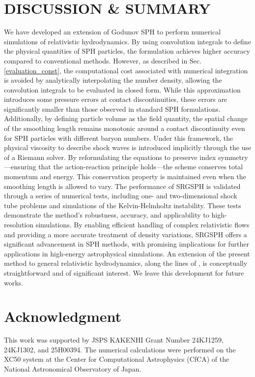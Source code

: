\documentclass[]{aastex631}
\begin{document}
\section{DISCUSSION \& SUMMARY}
We have developed an extension of Godunov SPH to perform numerical simulations of relativistic hydrodynamics.
By using convolution integrals to define the physical quantities of SPH particles, the formulation achieves higher accuracy compared to conventional methods.
However, as described in Sec. \ref{evaluation_const}, the computational cost associated with numerical integration is avoided by analytically interpolating the number density, allowing the convolution integrals to be evaluated in closed form.
While this approximation introduces some pressure errors at contact discontinuities, these errors are significantly smaller than those observed in standard SPH formulations.
Additionally, by defining particle volume as the field quantity, the spatial change of the smoothing length remains monotonic around a contact discontinuity even for SPH particles with different baryon numbers. Under this framework, the physical viscosity to describe shock waves is introduced implicitly through the use of a Riemann solver.
By reformulating the equations to preserve index symmetry—ensuring that the action-reaction principle holds—the scheme conserves total momentum and energy.
This conservation property is maintained even when the smoothing length is allowed to vary.
The performance of SRGSPH is validated through a series of numerical tests, including one- and two-dimensional shock tube problems and simulations of the Kelvin-Helmholtz instability. These tests demonstrate the method’s robustness, accuracy, and applicability to high-resolution simulations. By enabling efficient handling of complex relativistic flows and providing a more accurate treatment of density variations, SRGSPH offers a significant advancement in SPH methods, with promising implications for further applications in high-energy astrophysical simulations.
An extension of the present method to general relativistic hydrodynamics, along the lines of \citep[e.g.,][]{Rosswog_2010GR,Liptai&Price_2019}, is conceptually straightforward and of significant interest. We leave this development for future works.


\section*{Acknowledgment}
This work was supported by JSPS KAKENHI Grant Number 24KJ1259, 24KJ1302, and 25H00394.
 The numerical calculations were performed on the XC50 system at the Center for Computational Astrophysics (CfCA) of the National Astronomical Observatory of Japan.



\clearpage

{}

\end{document}
